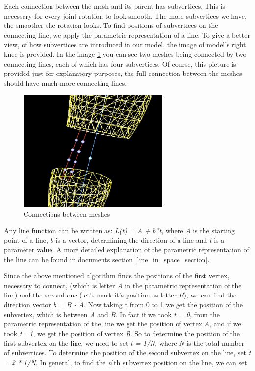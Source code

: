 \documentclass[times, 10pt,twocolumn]{article}
\begin{document}
Each connection between the mesh and its parent has subvertices. This is necessary for every joint rotation to look smooth. The more subvertices we have, the smoother the rotation looks. To find positions of subvertices on the connecting line, we apply the parametric representation of a line. To give a better view, of how subvertices are introduced in our model, the image of model's right knee is provided. In the image \ref{our_mesh_connection} you can see two meshes being connected by two connecting lines, each of which has four subvertices. Of course, this picture is provided just for explanatory purposes, the full connection between the meshes should have much more connecting lines.

\begin{figure}[H]
  \caption{Connections between meshes}
  \label{our_mesh_connection}
  \centering
  \includegraphics[width=75mm]{images/mesh_connection.jpg}
\end{figure}

Any line function can be written as: \emph{L(t) = A + b*t}, where \emph{A} is the starting point of a line, \emph{b} is a vector, determining the direction of a line and \emph{t} is a parameter value. A more detailed explanation of the parametric representation of the line can be found in documents section \ref{line_in_space_section}.

Since the above mentioned algorithm finds the positions of the first vertex, necessary to connect, (which is letter \emph{A} in the parametric representation of the line) and the second one (let's mark it's position as letter \emph{B}), we can find the direction vector \emph{b = B - A}. Now taking t from 0 to 1 we get the position of the subvertex, which is between \emph{A} and \emph{B}. In fact if we took \emph{t = 0}, from the parametric representation of the line we get the position of vertex \emph{A}, and if we took \emph{t =1}, we get the position of vertex \emph{B}. So to determine the position of the first subvertex on the line, we need to set \emph{t = 1/N}, where \emph{N} is the total number of subvertices. To determine the position of the second subvertex on the line, set \emph{t = 2 * 1/N}. In general, to find the \emph{n}'th subvertex position on the line, we can set
\end{document}

